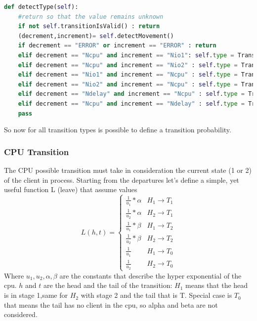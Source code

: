 \documentclass[12pt,a4paper]{article}
\begin{document}
\begin{lstlisting}[language=python]
    def detectType(self):
    #return so that the value remains unknown
    if not self.transitionIsValid() : return
    (decrement,increment)= self.detectMovement()
    if decrement == "ERROR" or increment == "ERROR" : return 
    elif decrement == "Ncpu" and increment == "Nio1": self.type = Transition.TransitionType.CPU_TO_IO1
    elif decrement == "Ncpu" and increment == "Nio2" : self.type = Transition.TransitionType.CPU_TO_IO2
    elif decrement == "Nio1" and increment == "Ncpu" : self.type = Transition.TransitionType.IO1_TO_CPU
    elif decrement == "Nio2" and increment == "Ncpu" : self.type = Transition.TransitionType.IO2_TO_CPU
    elif decrement == "Ndelay" and increment == "Ncpu" : self.type = Transition.TransitionType.DELAY_TO_CPU
    elif decrement == "Ncpu" and increment == "Ndelay" : self.type = Transition.TransitionType.CPU_TO_DELAY
    pass
\end{lstlisting}

So now for all transition types is possible to define a transition probability. \pagebreak

\subsubsection{CPU Transition}

The CPU possible transition must take in consideration the current state (1 or 2) of the client in process. Starting from the departures let's define a simple, yet useful function L (leave) that assume values 
$$L(h,t)=
\begin{cases}
    \frac{1}{u_1}*\alpha &  H_1 \rightarrow T_1 \\
    \frac{1}{u_2}*\alpha & H_2 \rightarrow T_1\\
    \frac{1}{u_1}*\beta & H_1 \rightarrow T_2 \\
    \frac{1}{u_2}*\beta & H_2 \rightarrow T_2\\
    \frac{1}{u_1} & H_1 \rightarrow T_0\\
    \frac{1}{u_2} & H_2 \rightarrow T_0
\end{cases}
$$
Where $u_1,u_2,\alpha,\beta$ are the constants that describe the hyper exponential of the cpu. $h$ and $t$ are the head and the tail of the transition: $H_1$ means that the head is in stage 1,same for $H_2$ with stage 2 and the tail that is T. Special case is $T_0$ that means the tail has no client in the cpu, so alpha and beta are not considered.  
\end{document}
